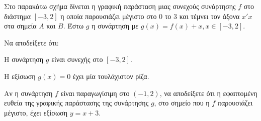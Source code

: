 Στο παρακάτω σχήμα δίνεται η γραφική παράσταση μιας συνεχούς συνάρτησης $f$ στο διάστημα $[-3,2]$ η οποία παρουσιάζει μέγιστο στο $0$ το $3$ και τέμνει τον άξονα $x'x$ στα σημεία $A$ και $B$. Έστω $g$ η συνάρτηση με $g(x) = f(x) + x, x \in [-3,2]$.

\begin{alist}
    \item Να αποδείξετε ότι:
    \begin{rlist}
        \item Η συνάρτηση $g$ είναι συνεχής στο $[-3,2]$. 
        \item Η εξίσωση $g(x) = 0$ έχει μία τουλάχιστον ρίζα. 
    \end{rlist}
    \item Αν η συνάρτηση $f$ είναι παραγωγίσιμη στο $(-1,2)$, να αποδείξετε ότι η εφαπτομένη ευθεία της γραφικής παράστασης της συνάρτησης $g$, στο σημείο που η $f$ παρουσιάζει μέγιστο, έχει εξίσωση $y = x + 3$. 
\end{alist}